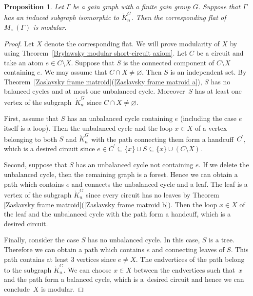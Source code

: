 \documentclass[pdftex]{sigma}
\numberwithin{equation}{section}
\newtheorem{Proposition}[Theorem]{Proposition}
 { \theoremstyle{definition}
\newtheorem{Definition}[Theorem]{Definition}
\newtheorem{Example}[Theorem]{Example}
\newtheorem{Remark}[Theorem]{Remark}
\newtheorem{Question}[Theorem]{Question} }
\begin{document}
\begin{Proposition}\label{frame modular}
Let $ \Gamma $ be a gain graph with a finite gain group $ G $.
Suppose that $ \Gamma $ has an induced subgraph isomorphic to $ \mathring{K}_{n}^{G} $.
Then the corresponding flat of~$ M_{\times}(\Gamma) $ is modular.
\end{Proposition}
\begin{proof}
Let $ X $ denote the corresponding flat.
We will prove modularity of $ X $ by using Theorem~\ref{Brylawsky modular short-circuit axiom}.
Let $ C $ be a circuit and take an atom $ e \in C \setminus X $.
Suppose that $ S $ is the connected component of $ C \setminus X $ containing $ e $.
We may assume that $ C \cap X \neq \varnothing $.
Then $ S $ is an independent set.
By Theorem~\ref{Zaslavsky frame matroid}(\ref{Zaslavsky frame matroid a}), $ S $ has no balanced cycles and at most one unbalanced cycle. Moreover~$ S $ has at least one vertex of the subgraph~$ \mathring{K}_{n}^{G} $ since $ C \cap X \neq \varnothing $.

First, assume that $ S $ has an unbalanced cycle containing $ e $ (including the case $ e $ itself is a loop).
Then the unbalanced cycle and the loop $ x \in X $ of a vertex belonging to both $ S $ and $ \mathring{K}_{n}^{G} $ with the path connecting them form a handcuff~$ C^{\prime} $, which is a desired circuit since $ e \in C^{\prime} \subseteq \{x\} \cup S \subseteq \{x\} \cup (C\setminus X) $.

Second, suppose that $ S $ has an unbalanced cycle not containing $ e $.
If we delete the unbalanced cycle, then the remaining graph is a forest.
Hence we can obtain a path which contains $ e $ and connects the unbalanced cycle and a leaf.
The leaf is a vertex of the subgraph $ \mathring{K}_{n}^{G} $ since every circuit has no leaves by Theorem \ref{Zaslavsky frame matroid}(\ref{Zaslavsky frame matroid b}).
Then the loop $ x \in X $ of the leaf and the unbalanced cycle with the path form a handcuff, which is a desired circuit.

Finally, consider the case $ S $ has no unbalanced cycle.
In this case, $ S $ is a tree.
Therefore we can obtain a path which contains $ e $ and connecting leaves of $ S $.
This path contains at least $ 3 $ vertices since $ e \neq X $.
The endvertices of the path belong to the subgraph $ \mathring{K}_{n}^{G} $.
We can choose $ x \in X $ between the endvertices such that~$ x $ and the path form a balanced cycle, which is a~desired circuit and hence we can conclude~$ X $ is modular.
\end{proof}
\end{document}

